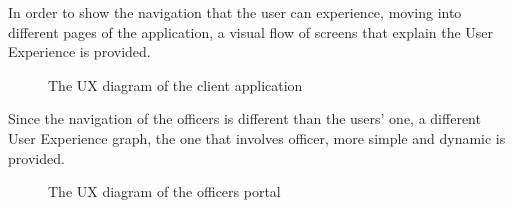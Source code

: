 In order to show the navigation that the user can experience, moving into different pages of the application, a visual flow of screens that explain the User Experience is provided.

\begin{center}
\begin{figure}[htp] 
\caption{The UX diagram of the client application} 
\label{fig:uxUser} 
\end{figure} 
\end{center}

\clearpage
Since the navigation of the officers is different than the users' one, a different User Experience graph, the one that involves officer, more simple and dynamic is provided.

\begin{center}
	\begin{figure}[htp] 
		\caption{The UX diagram of the officers portal} 
		\label{fig:uxOfficer} 
	\end{figure} 
\end{center}